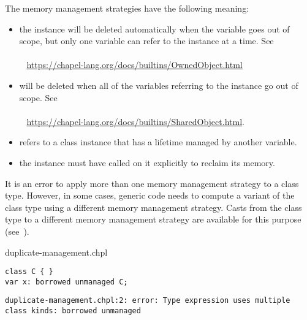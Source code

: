 The memory management strategies have the following meaning:

\begin{itemize}
  \item {} the instance will be deleted
    automatically when the  variable goes out of scope, but
    only one  variable can refer to the instance at a time.
    See
    \\ %
    \mbox{$$ $$ $$ $$ $$} %
    \url{https://chapel-lang.org/docs/builtins/OwnedObject.html}

  \item {} will be deleted when all of the 
    variables referring to the instance go out of scope.
    See
    \\ %
    \mbox{$$ $$ $$ $$ $$} %
    \url{https://chapel-lang.org/docs/builtins/SharedObject.html}.

  \item {} refers to a class instance that has a lifetime
    managed by another variable.

  \item {} the instance must have  called on
    it explicitly to reclaim its memory.

\end{itemize}

It is an error to apply more than one memory management strategy to a
class type. However, in some cases, generic code needs to compute a
variant of the class type using a different memory management strategy.
Casts from the class type to a different memory management strategy
are available for this purpose (see~).

\begin{chapelexample}{duplicate-management.chpl}
\begin{chapel}
\begin{verbatim}
class C { }
var x: borrowed unmanaged C;
\end{verbatim}
\end{chapel}
\begin{chapeloutput}
\begin{verbatim}
duplicate-management.chpl:2: error: Type expression uses multiple class kinds: borrowed unmanaged
\end{verbatim}
\end{chapeloutput}
\end{chapelexample}


